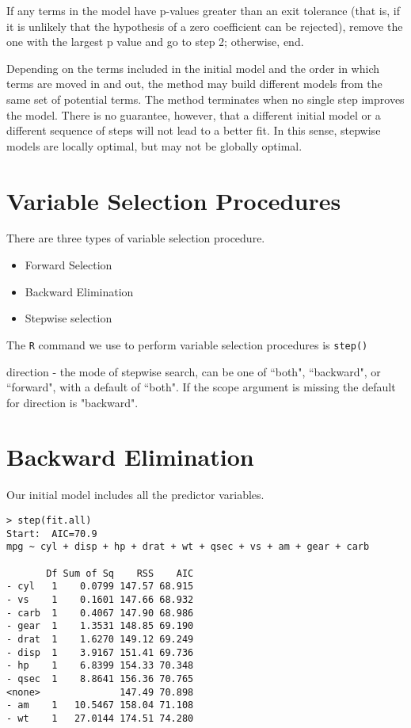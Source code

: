 \documentclass[a4paper,12pt]{article}
\begin{document}
If any terms in the model have p-values greater than an exit tolerance (that is, if it is unlikely that the hypothesis of a zero coefficient can be rejected), remove the one with the largest p value and go to step 2; otherwise, end.

Depending on the terms included in the initial model and the order in which terms are moved in and out, the method may build different models from the same set of potential terms. The method terminates when no single step improves the model. There is no guarantee, however, that a different initial model or a different sequence of steps will not lead to a better fit. In this sense, stepwise models are locally optimal, but may not be globally optimal.


\newpage
\section{Variable Selection Procedures}


There are three types of variable selection procedure.
\begin{itemize}
\item Forward Selection
\item Backward Elimination
\item Stepwise selection
\end{itemize}

The \texttt{R} command we use to perform variable selection procedures is \texttt{step()}

direction  - the mode of stepwise search, can be one of ``both", ``backward", or ``forward", with a default of ``both". If the scope argument is missing the default for direction is "backward".

\section{Backward Elimination}
Our initial model includes all the predictor variables.
\footnotesize\begin{verbatim}
> step(fit.all)
Start:  AIC=70.9
mpg ~ cyl + disp + hp + drat + wt + qsec + vs + am + gear + carb

       Df Sum of Sq    RSS    AIC
- cyl   1    0.0799 147.57 68.915
- vs    1    0.1601 147.66 68.932
- carb  1    0.4067 147.90 68.986
- gear  1    1.3531 148.85 69.190
- drat  1    1.6270 149.12 69.249
- disp  1    3.9167 151.41 69.736
- hp    1    6.8399 154.33 70.348
- qsec  1    8.8641 156.36 70.765
<none>              147.49 70.898
- am    1   10.5467 158.04 71.108
- wt    1   27.0144 174.51 74.280
\end{verbatim}\normalsize
\end{document}
